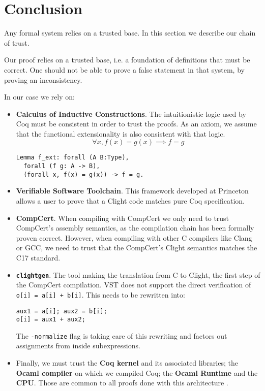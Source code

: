 \section{Conclusion}
\label{sec:Conclusion}

Any formal system relies on a trusted base. In this section we describe our
chain of trust.

Our proof relies on a trusted base, i.e. a foundation of definitions that must be
correct. One should not be able to prove a false statement in that system, \eg by
proving an inconsistency.

In our case we rely on:
\begin{itemize}
  \item \textbf{Calculus of Inductive Constructions}. The intuitionistic logic
  used by Coq must be consistent in order to trust the proofs. As an axiom,
  we assume that the functional extensionality is also consistent with that logic.
  $$\forall x, f(x) = g(x) \implies f = g$$
\begin{lstlisting}[language=Coq,belowskip=-0.25 \baselineskip]
Lemma f_ext: forall (A B:Type),
  forall (f g: A -> B),
  (forall x, f(x) = g(x)) -> f = g.
\end{lstlisting}

  \item \textbf{Verifiable Software Toolchain}. This framework developed at
  Princeton allows a user to prove that a Clight code matches pure Coq
  specification.

  \item \textbf{CompCert}. When compiling with CompCert we only need to trust
  CompCert's {assembly} semantics, as the compilation chain has been formally proven correct.
  However, when compiling with other C compilers like Clang or GCC, we need to
  trust that the CompCert's Clight semantics matches the C17 standard.

  \item \textbf{\texttt{clightgen}}. The tool making the translation from {C} to
  {Clight}, the first step of the CompCert compilation.
  VST does not support the direct verification of \texttt{o[i] = a[i] + b[i]}.
  This needs to be rewritten into:
  \begin{lstlisting}[language=Ctweetnacl,stepnumber=0,belowskip=-0.5 \baselineskip]
aux1 = a[i]; aux2 = b[i];
o[i] = aux1 + aux2;
\end{lstlisting}
  The \texttt{-normalize} flag is taking care of this
  rewriting and factors out assignments from inside subexpressions.

  \item Finally, we must trust the \textbf{Coq kernel} and its
  associated libraries; the \textbf{Ocaml compiler} on which we compiled Coq;
  the \textbf{Ocaml Runtime} and the \textbf{CPU}. Those are common to all proofs
  done with this architecture \cite{2015-Appel,coq-faq}.
\end{itemize}


